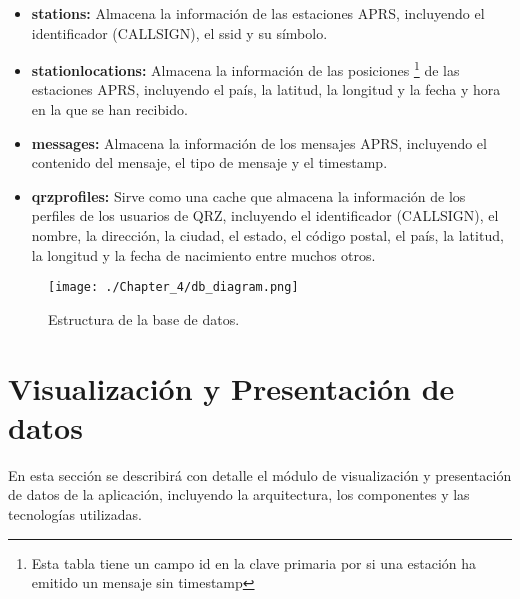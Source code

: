 \begin{itemize}
	\item \textbf{stations:} Almacena la información de las estaciones APRS, incluyendo el identificador (CALLSIGN), el ssid y su símbolo.
	\item \textbf{station\textunderscore locations:} Almacena la información de las posiciones \footnote[1]{Esta tabla tiene un campo id en la clave primaria por si una estación ha emitido un mensaje sin timestamp} de las estaciones APRS, incluyendo el país, la latitud, la longitud y la fecha y hora en la que se han recibido.
	\item \textbf{messages:} Almacena la información de los mensajes APRS, incluyendo el contenido del mensaje, el tipo de mensaje y el timestamp.
	\item \textbf{qrz\textunderscore profiles:} Sirve como una cache que almacena la información de los perfiles de los usuarios de QRZ, incluyendo el identificador (CALLSIGN), el nombre, la dirección, la ciudad, el estado, el código postal, el país, la latitud, la longitud y la fecha de nacimiento entre muchos otros.
\end{itemize}

\begin{figure}[!h]
	\centering
	\texttt{[image: ./Chapter\_4/db\_diagram.png]}
	\caption{Estructura de la base de datos.}
	\label{fig:db-model}
\end{figure}

\section{Visualización y Presentación de datos}

En esta sección se describirá con detalle el módulo de visualización y presentación de datos de la aplicación, incluyendo la arquitectura, los componentes y las tecnologías utilizadas.

